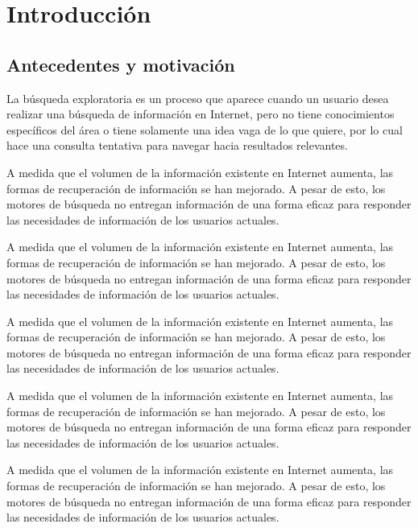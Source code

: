 
\chapter{Introducción}
\label{ch:introduccion}
\setcounter{page}{1}
\section{Antecedentes y motivación}
\label{sec:antecedentes-motivacion}
La búsqueda exploratoria es un proceso que aparece cuando un usuario desea realizar una búsqueda de información en Internet, pero no tiene conocimientos específicos del área o tiene solamente una idea vaga de lo que quiere, por lo cual hace una consulta tentativa para navegar hacia resultados relevantes.

A medida que el volumen de la información existente en Internet aumenta, las formas de recuperación de información se han mejorado. A pesar de esto, los motores de búsqueda no entregan información de una forma eficaz para responder las necesidades de información de los usuarios actuales.

A medida que el volumen de la información existente en Internet aumenta, las formas de recuperación de información se han mejorado. A pesar de esto, los motores de búsqueda no entregan información de una forma eficaz para responder las necesidades de información de los usuarios actuales.

A medida que el volumen de la información existente en Internet aumenta, las formas de recuperación de información se han mejorado. A pesar de esto, los motores de búsqueda no entregan información de una forma eficaz para responder las necesidades de información de los usuarios actuales.

A medida que el volumen de la información existente en Internet aumenta, las formas de recuperación de información se han mejorado. A pesar de esto, los motores de búsqueda no entregan información de una forma eficaz para responder las necesidades de información de los usuarios actuales.

A medida que el volumen de la información existente en Internet aumenta, las formas de recuperación de información se han mejorado. A pesar de esto, los motores de búsqueda no entregan información de una forma eficaz para responder las necesidades de información de los usuarios actuales.

